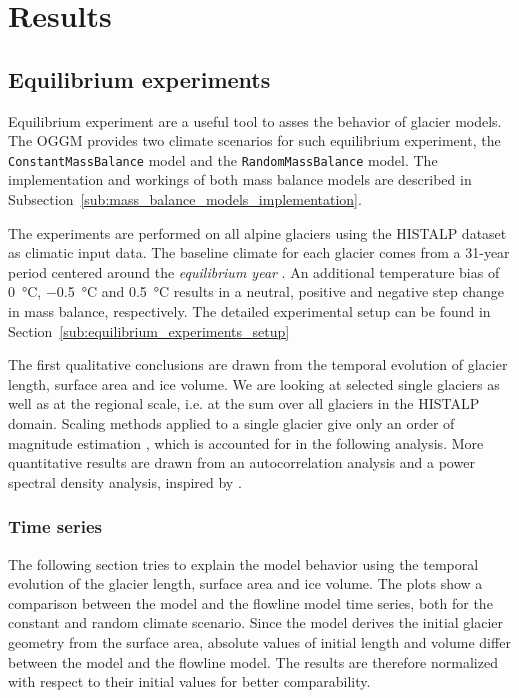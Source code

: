 \chapter{Results}\label{chap:results}
\thispagestyle{plain}

\section{Equilibrium experiments} %
\label{sec:equilibrium_experiments_results}
    Equilibrium experiment are a useful tool to asses the behavior of glacier models. The OGGM provides two climate scenarios for such equilibrium experiment, the \lstinline`ConstantMassBalance` model and the \lstinline`RandomMassBalance` model. The implementation and workings of both mass balance models are described in Subsection~\ref{sub:mass_balance_models_implementation}.

    The experiments are performed on all alpine glaciers using the HISTALP dataset \citep{Auer2007} as climatic input data. The baseline climate for each glacier comes from a 31-year period centered around the \textit{equilibrium year} \tstar. An additional temperature bias of \SI{0}{\celsius}, \SI{-0.5}{\celsius} and \SI{+0.5}{\celsius} results in a neutral, positive and negative step change in mass balance, respectively. The detailed experimental setup can be found in Section~\ref{sub:equilibrium_experiments_setup}

    The first qualitative conclusions are drawn from the temporal evolution of glacier length, surface area and ice volume. We are looking at selected single glaciers as well as at the regional scale, i.e. at the sum over all glaciers in the HISTALP domain. Scaling methods applied to a single glacier give only an order of magnitude estimation \citep[section 8.5][cf.]{Bahr2015}, which is accounted for in the following analysis. More quantitative results are drawn from an autocorrelation analysis and a power spectral density analysis, inspired by \citet{Roe2014}.
    
    \subsection{Time series} %
    \label{sub:time_series_results}

      The following section tries to explain the model behavior using the temporal evolution of the glacier length, surface area and ice volume. The plots show a comparison between the \vas{} model and the flowline model time series, both for the constant and random climate scenario. Since the \vas{} model derives the initial glacier geometry from the surface area, absolute values of initial length and volume differ between the \vas{} model and the flowline model. The results are therefore normalized with respect to their initial values for better comparability. 

